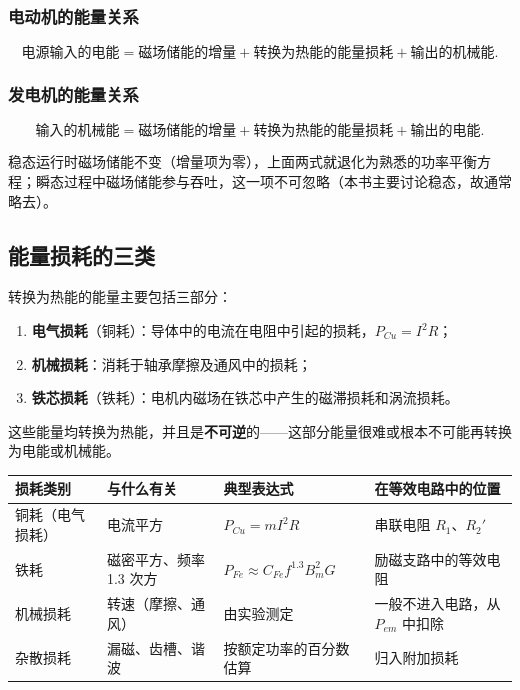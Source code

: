 \subsubsection{电动机的能量关系}
\begin{equation}
\text{电源输入的电能}=\text{磁场储能的增量}+\text{转换为热能的能量损耗}+\text{输出的机械能}.
\end{equation}

\subsubsection{发电机的能量关系}
\begin{equation}
\text{输入的机械能}=\text{磁场储能的增量}+\text{转换为热能的能量损耗}+\text{输出的电能}.
\end{equation}

稳态运行时磁场储能不变（增量项为零），上面两式就退化为熟悉的功率平衡方程；瞬态过程中磁场储能参与吞吐，这一项不可忽略（本书主要讨论稳态，故通常略去）。

\subsection{能量损耗的三类}
转换为热能的能量主要包括三部分：
\begin{enumerate}
  \item \textbf{电气损耗}（铜耗）：导体中的电流在电阻中引起的损耗，$P_{Cu}=I^2R$；
  \item \textbf{机械损耗}：消耗于轴承摩擦及通风中的损耗；
  \item \textbf{铁芯损耗}（铁耗）：电机内磁场在铁芯中产生的磁滞损耗和涡流损耗。
\end{enumerate}
这些能量均转换为热能，并且是\textbf{不可逆}的——这部分能量很难或根本不可能再转换为电能或机械能。

\begin{center}
\begin{tabular}{@{}llll@{}}
\toprule
损耗类别 & 与什么有关 & 典型表达式 & 在等效电路中的位置 \\
\midrule
铜耗（电气损耗） & 电流平方 & $P_{Cu}=mI^2R$ & 串联电阻 $R_1$、$R_2'$ \\
铁耗 & 磁密平方、频率 1.3 次方 & $P_{Fe}\approx C_{Fe}f^{1.3}B_m^2G$ & 励磁支路中的等效电阻 \\
机械损耗 & 转速（摩擦、通风） & 由实验测定 & 一般不进入电路，从 $P_{em}$ 中扣除 \\
杂散损耗 & 漏磁、齿槽、谐波 & 按额定功率的百分数估算 & 归入附加损耗 \\
\bottomrule
\end{tabular}
\end{center}

